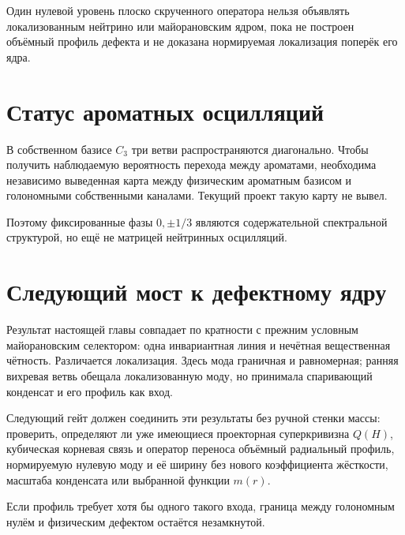 \begin{nogocriterion}
Один нулевой уровень плоско скрученного оператора нельзя объявлять
локализованным нейтрино или майорановским ядром, пока не построен объёмный
профиль дефекта и не доказана нормируемая локализация поперёк его ядра.
\end{nogocriterion}

\section{Статус ароматных осцилляций}

В собственном базисе $C_3$ три ветви распространяются диагонально. Чтобы
получить наблюдаемую вероятность перехода между ароматами, необходима
независимо выведенная карта между физическим ароматным базисом и
голономными собственными каналами. Текущий проект такую карту не вывел.

Поэтому фиксированные фазы $0,\pm1/3$ являются содержательной спектральной
структурой, но ещё не матрицей нейтринных осцилляций.

\section{Следующий мост к дефектному ядру}

Результат настоящей главы совпадает по кратности с прежним условным
майорановским селектором: одна инвариантная линия и нечётная вещественная
чётность. Различается локализация. Здесь мода граничная и равномерная;
ранняя вихревая ветвь обещала локализованную моду, но принимала
спаривающий конденсат и его профиль как вход.

Следующий гейт должен соединить эти результаты без ручной стенки массы:
проверить, определяют ли уже имеющиеся проекторная суперкривизна $Q(H)$,
кубическая корневая связь и оператор переноса объёмный радиальный профиль,
нормируемую нулевую моду и её ширину без нового коэффициента жёсткости,
масштаба конденсата или выбранной функции $m(r)$.

Если профиль требует хотя бы одного такого входа, граница между
голономным нулём и физическим дефектом остаётся незамкнутой.

